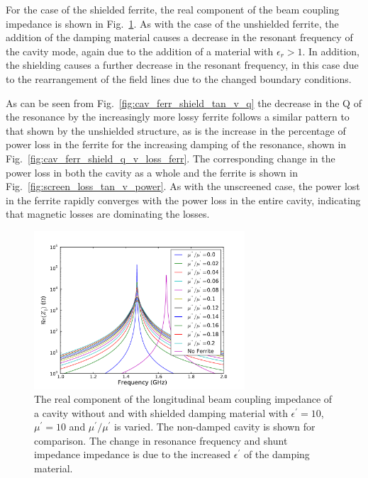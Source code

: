 For the case of the shielded ferrite, the real component of the beam coupling impedance is shown in Fig.~\ref{fig:screen_long_imp}. As with the case of the unshielded ferrite, the addition of the damping material causes a decrease in the resonant frequency of the cavity mode, again due to the addition of a material with $\epsilon_{r} > 1$. In addition, the shielding causes a further decrease in the resonant frequency, in this case due to the rearrangement of the field lines due to the changed boundary conditions.

As can be seen from Fig.~\ref{fig:cav_ferr_shield_tan_v_q} the decrease in the Q of the resonance by the increasingly more lossy ferrite follows a similar pattern to that shown by the unshielded structure, as is the increase in the percentage of power loss in the ferrite for the increasing damping of the resonance, shown in Fig.~\ref{fig:cav_ferr_shield_q_v_loss_ferr}. The corresponding change in the power loss in both the cavity as a whole and the ferrite is shown in Fig.~\ref{fig:screen_loss_tan_v_power}. As with the unscreened case, the power lost in the ferrite rapidly converges with the power loss in the entire cavity, indicating that magnetic losses are dominating the losses.	

\begin{figure}
\begin{center}
\includegraphics[width=0.7\textwidth]{Beam_Coupling_Impedance_Reduction_Techniques/figures/screen_long_imp_all.pdf}
\end{center}
\caption{The real component of the longitudinal beam coupling impedance of a cavity without and with shielded damping material with $\epsilon^{'}=10$, $\mu^{'}=10$ and $\mu^{'}/\mu^{'}$ is varied. The non-damped cavity is shown for comparison. The change in resonance frequency and shunt impedance impedance is due to the increased $\epsilon^{'}$ of the damping material.}
\label{fig:screen_long_imp}
\end{figure}


